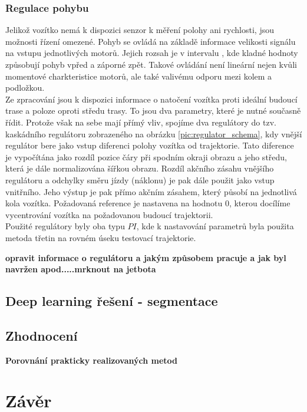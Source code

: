 \documentclass[czech, bc, kky, he, iso690alph]{fasthesis}
\begin{document}
            \subsection{Regulace pohybu}
                Jelikož vozítko nemá k dispozici senzor k měření polohy ani rychlosti, jsou možnosti řízení omezené. Pohyb se ovládá na základě informace velikosti signálu na vstupu jednotlivých motorů. Jejich rozsah je v intervalu \(<-1,1>\), kde kladné hodnoty způsobují pohyb vpřed a záporné zpět. Takové ovládání není lineární nejen kvůli momentové charkteristice motorů, ale také valivému odporu mezi kolem a podložkou.\\
                Ze zpracování jsou k dispozici informace o natočení vozítka proti ideální budoucí trase a poloze oproti středu trasy. To jsou dva parametry, které je nutné současně řídit. Protože však na sebe mají přímý vliv, spojíme dva regulátory do tzv. kaskádního regulátoru zobrazeného na obrázku \ref{pic:regulator_schema}, kdy vnější regulátor bere jako vstup diferenci polohy vozítka od trajektorie. Tato diference je vypočítána jako rozdíl pozice čáry při spodním okraji obrazu a jeho středu, která je dále normalizována šířkou obrazu.  Rozdíl akčního zásahu vnějšího regulátoru a odchylky směru jízdy (náklonu) je pak dále použit jako vstup vnitřního. Jeho výstup je pak přímo akčním zásahem, který působí na jednotlivá kola vozítka. Požadovaná reference je nastavena na hodnotu \(0\), kterou docílíme vycentrování vozítka na požadovanou budoucí trajektorii.\\
                Použité regulátory byly oba typu \(PI\), kde k nastavování parametrů byla použita metoda třetin na rovném úseku testovací trajektorie.
                 
                \textbf{opravit informace o regulátoru a jakým způsobem pracuje a jak byl navržen apod.....mrknout na jetbota}
        \section{Deep learning řešení - segmentace}
        \section{Zhodnocení}
        	\textbf{Porovnání prakticky realizovaných metod}
    \chapter{Závěr}
\end{document}
